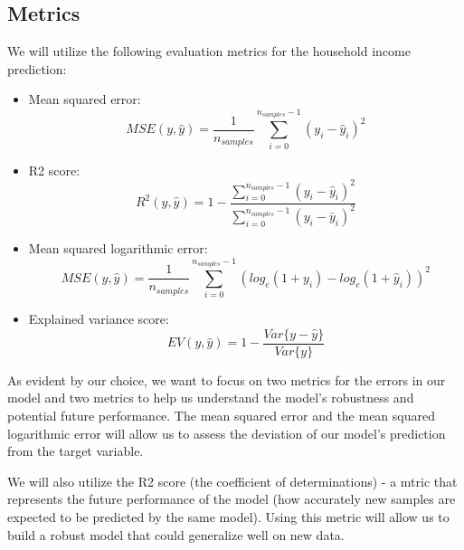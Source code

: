 \documentclass{article}
\begin{document}
\subsection{Metrics}
We will utilize the following evaluation metrics for the household income prediction:
\begin{itemize}
  \item Mean squared error:
    \begin{equation}
      MSE(y, \hat{y}) = \frac{1}{n_{samples}}\sum_{i=0}^{n_{samples} - 1}(y_i - \hat{y}_i)^2
    \end{equation}
  \item R2 score:
    \begin{equation}
      R^2(y, \hat{y}) = 1 - \frac{\sum_{i=0}^{n_{samples} - 1}(y_i - \hat{y}_i)^2}{\sum_{i=0}^{n_{samples} - 1}(y_i - \bar{y}_i)^2}
    \end{equation}
  \item Mean squared logarithmic error:
    \begin{equation}
      MSE(y, \hat{y}) = \frac{1}{n_{samples}}\sum_{i=0}^{n_{samples} - 1}(log_e(1 + y_i) - log_e(1 + \hat{y}_i))^2
    \end{equation}
  \item Explained variance score:
    \begin{equation}
      EV(y, \hat{y}) = 1 - \frac{Var\{y - \hat{y}\}}{Var\{y\}}
    \end{equation}
\end{itemize}

As evident by our choice, we want to focus on two metrics for the errors in our model and two metrics to help us understand the model's robustness and potential future performance. The mean squared error and the mean squared logarithmic error will allow us to assess the deviation of our model's prediction from the target variable.

We will also utilize the R2 score (the coefficient of determinations) - a mtric that represents the future performance of the model (how accurately new samples are expected to be predicted by the same model). Using this metric will allow us to build a robust model that could generalize well on new data.
\end{document}
